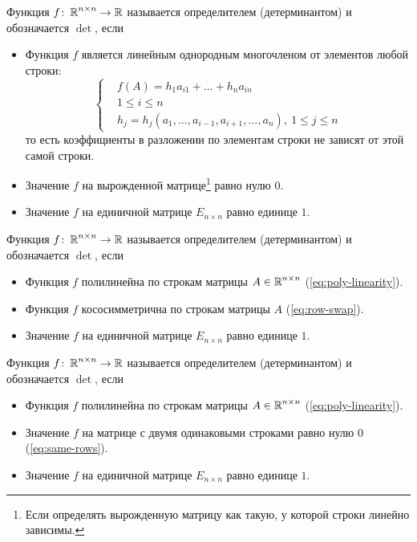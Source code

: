 \documentclass[a4paper,12pt]{article}
\begin{document}
  \begin{definition}
    Функция $f \colon \operatorname{\mathbb R}^{n \times n} \to \operatorname{\mathbb R}$ называется определителем (детерминантом) и обозначается $\det$, если
    \begin{itemize}
      \item Функция $f$ является линейным однородным многочленом от элементов любой строки:
      \[
        \left\{
          \begin{aligned}
            &f(A) = h_1 a_{i1} + \ldots + h_n a_{in}\\
            &1 \leq i \leq n\\
            &h_j = h_j(a_1, \ldots, a_{i-1}, a_{i+1}, \ldots, a_{n}),\ 1 \leq j \leq n
          \end{aligned}
        \right.
      \]
      то есть коэффициенты в разложении по элементам строки не зависят от этой самой строки.
      
      \item Значение $f$ на вырожденной матрице\footnote{Если определять вырожденную матрицу как такую, у которой строки линейно зависимы.} равно нулю $0$.
      \item Значение $f$ на единичной матрице $E_{n \times n}$ равно единице $1$.
    \end{itemize}
  \end{definition}
  
  \begin{definition}
    Функция $f \colon \operatorname{\mathbb R}^{n \times n} \to \operatorname{\mathbb R}$ называется определителем (детерминантом) и обозначается $\det$, если
    \begin{itemize}
      \item Функция $f$ полилинейна по строкам матрицы $A \in \operatorname{\mathbb R}^{n \times n}$ (\ref{eq:poly-linearity}).
      \item Функция $f$ кососимметрична по строкам матрицы $A$ (\ref{eq:row-swap}).
      \item Значение $f$ на единичной матрице $E_{n \times n}$ равно единице $1$.
    \end{itemize}
  \end{definition}
  
  \begin{definition}
    Функция $f \colon \operatorname{\mathbb R}^{n \times n} \to \operatorname{\mathbb R}$ называется определителем (детерминантом) и обозначается $\det$, если
    \begin{itemize}
      \item Функция $f$ полилинейна по строкам матрицы $A \in \operatorname{\mathbb R}^{n \times n}$ (\ref{eq:poly-linearity}).
      \item Значение $f$ на матрице с двумя одинаковыми строками равно нулю $0$ (\ref{eq:same-rows}).
      \item Значение $f$ на единичной матрице $E_{n \times n}$ равно единице $1$.
    \end{itemize}
  \end{definition}
  
\end{document}
